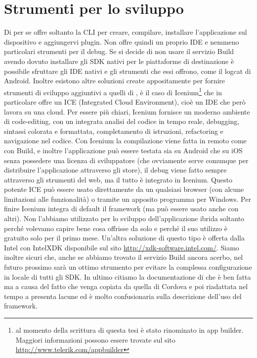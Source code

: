     \section{Strumenti per lo sviluppo}
    Di per se \pg{} offre soltanto la CLI per creare, compilare,
    installare l'applicazione sul dispositivo e aggiungervi plugin. Non
    offre quindi un proprio IDE e nemmeno particolari strumenti per il
    debug. Se si decide di non usare il servizio \pg{} Build avendo dovuto
    installare gli SDK nativi per le piattaforme di destinazione è
    possibile sfruttare gli IDE nativi e gli strumenti che essi offrono,
    come il logcat di Android. Inoltre esistono altre soluzioni create
    appositamente per fornire strumenti di sviluppo aggiuntivi a quelli di
    \pg{}, è il caso di Icenium\footnote{al momento della scrittura di
    questa tesi è stato rinominato in app builder.
    Maggiori informazioni possono essere trovate sul sito
    \url{http://www.telerik.com/appbuilder}} che in particolare offre un
    ICE (Integrated Cloud Environment), cioè un IDE che però lavora su una
    cloud. Per essere più chiari, Icenium fornisce un moderno ambiente di
    code-editing, con un integrata analisi del codice in tempo reale,
    debugging, sintassi colorata e formattata, completamento di istruzioni,
    refactoring e navigazione nel codice. Con Icenium la compilazione
    viene fatta in remoto come con \pg{} Build, e inoltre l'applicazione
    può essere testata sia su Android che su iOS senza possedere una
    licenza di sviluppatore (che ovviamente serve comunque per distribuire
    l'applicazione attraverso gli store), il debug viene fatto sempre
    attraverso gli strumenti del web, ma il tutto è integrato in Icenium.
    Questo potente ICE può essere usato direttamente da un qualsiasi browser
    (con alcune limitazioni alle funzionalità) o tramite un apposito
    programma per Windows. Per finire Icenium integra di default il
    frame\-work \kendomob{} (ma può essere usato anche con altri). Non
    l'abbiamo utilizzato per lo sviluppo dell'applicazione ibrida soltanto
    perché volevamo capire bene cosa offrisse da solo \pg{} e perché il
    suo utilizzo è gratuito solo per il primo mese. Un'altra soluzione di
    questo tipo è offerta dalla Intel con IntelXDK disponibile sul sito
    \url{http://xdk-software.intel.com/}. Siamo inoltre sicuri che,
    anche se abbiamo trovato il servizio \pg{} Build ancora acerbo, nel
    futuro prossimo sarà un ottimo strumento per evitare la complessa
    configurazione in locale di tutti gli SDK. In ultimo citiamo la
    documentazione di \pg{} che è ben fatta ma a causa del fatto che venga
    copiata da quella di Cordova e poi riadattata nel tempo a \pg{}
    presenta lacune ed è molto confusionaria sulla descrizione dell'uso
    del frame\-work.

